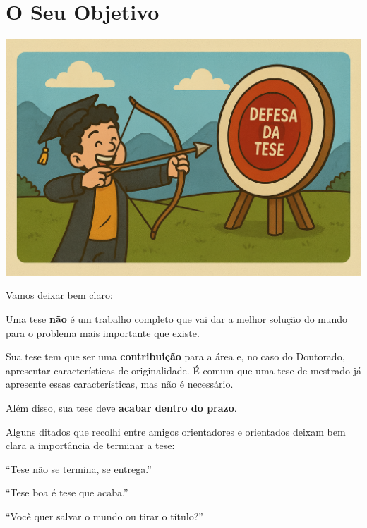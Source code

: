 \chapter{O Seu Objetivo}

\begin{center}
\includegraphics[width=0.5\linewidth]{Images/objetivoseta.png}    
\end{center}
\vspace{0.5cm}


Vamos deixar bem claro:


Uma tese \textbf{não} é um trabalho completo que vai dar a melhor solução do mundo para o problema mais importante que existe.


Sua tese tem que ser uma \textbf{contribuição} para a área e, no caso do Doutorado, apresentar características de originalidade. É comum que uma tese de mestrado já apresente essas características, mas não é necessário.

Além disso, sua tese deve \textbf{acabar dentro do prazo}.

Alguns ditados que recolhi entre amigos orientadores e orientados deixam bem clara a importância de terminar a tese:

\begin{center}
``Tese não se termina, se entrega.''

``Tese boa é tese que acaba.''

``Você quer salvar o mundo ou tirar o título?''
    
\end{center}

